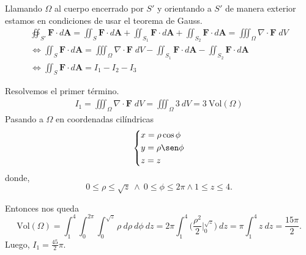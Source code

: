 \begin{solution}
    Llamando  $\Omega$  al cuerpo encerrado por $S'$ y orientando a $S'$ de manera exterior estamos en condiciones de usar el teorema de Gauss.
    \begin{gather*}
        \oiint _{S'} \mathbf{F}\cdot d\mathbf{A} =
        \iint _{S} \mathbf{F}\cdot d\mathbf{A} +
        \iint _{S_1} \mathbf{F}\cdot d\mathbf{A} +
        \iint _{S_2} \mathbf{F}\cdot d\mathbf{A}
        =\iiint _\Omega \nabla \cdot \mathbf{F}\;dV\\[.2cm]
        \iff \iint _{S} \mathbf{F}\cdot d\mathbf{A} =
        \iiint _\Omega \nabla \cdot \mathbf{F}\;dV -
        \iint _{S_1} \mathbf{F}\cdot d\mathbf{A} -
        \iint _{S_2} \mathbf{F}\cdot d\mathbf{A}\\[.2cm]
        \iff \iint _{S} \mathbf{F}\cdot d\mathbf{A} =
        I_1-I_2-I_3
    \end{gather*}

    Resolvemos el primer t\'ermino.
    \begin{align*}
        I_1=\iiint _\Omega \nabla \cdot \mathbf{F}\;dV = \iiint _\Omega3\:dV = 3\:\text{Vol}(\Omega)
    \end{align*}
    Pasando a  $\Omega$ en coordenadas cil\'indricas
    \[\begin{dcases}
            x=\rho \cos \phi \\
            y=\rho \sen \phi \\
            z=z
        \end{dcases}\] donde, $$0\leq\rho\leq \sqrt{z}\:\land\:0\leq\phi\leq 2\pi \land 1\leq z \leq 4.$$

    Entonces nos queda
    \[
        \text{Vol}(\Omega) =  \int_1^4  \int_0^{2\pi} \int_0^{\sqrt{z}}  \rho\:d\rho\:d\phi \:dz=2\pi  \int_1^4 \Big( \frac{\rho^2}{2}\Big|_0^{\sqrt{z}} \Big) \:dz =  \pi   \int_1^4   z  \:dz= \frac{15 \pi}{2}.
    \] Luego, $I_1 =  \frac{45}{2}\pi. $


\end{solution}
